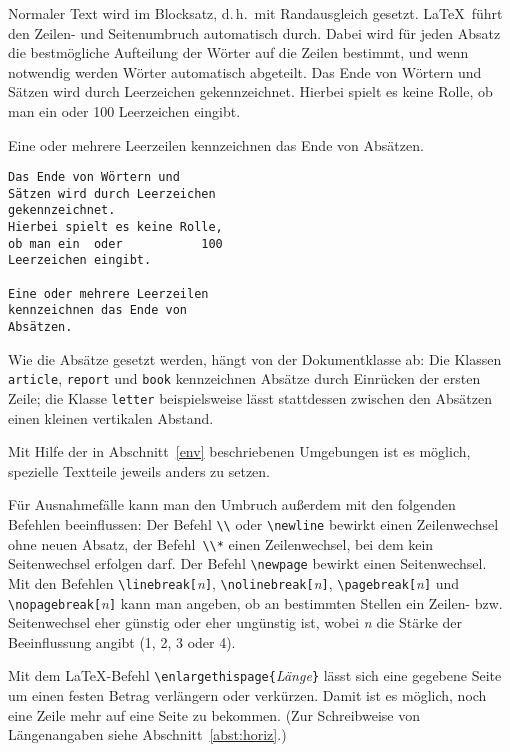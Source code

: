 Normaler Text wird im Blocksatz, d.\,h.~mit Randausgleich
gesetzt.  \LaTeX\ führt den Zeilen- und Seitenumbruch
automatisch durch.  Dabei wird für jeden Absatz die
bestmögliche Aufteilung der Wörter auf die Zeilen bestimmt,
und wenn notwendig werden Wörter automatisch abgeteilt.
\exa
\parindent=17pt\relax
{}\relax %
\noindent Das Ende von Wörtern und Sätzen wird durch Leerzeichen
gekennzeichnet.  Hierbei spielt es keine Rolle, ob man ein oder
100 Leerzeichen eingibt.
\par
Eine oder mehrere Leerzeilen
kennzeichnen das Ende von
Absätzen.
\exb
\begin{verbatim}
Das Ende von Wörtern und
Sätzen wird durch Leerzeichen 
gekennzeichnet.
Hierbei spielt es keine Rolle,
ob man ein  oder           100
Leerzeichen eingibt.
 
Eine oder mehrere Leerzeilen
kennzeichnen das Ende von
Absätzen.
\end{verbatim}
\exc
Wie die Absätze gesetzt werden, hängt von der Dokumentklasse ab: 
Die Klassen 
\texttt{article}, \texttt{report} und \texttt{book} kennzeichnen
Absätze durch Einrücken der ersten Zeile;
die Klasse \texttt{letter} beispielsweise lässt stattdessen 
zwischen den Absätzen einen kleinen vertikalen Abstand.

Mit Hilfe der in Abschnitt~\ref{env} beschriebenen Umgebungen ist
es möglich, spezielle Textteile jeweils anders zu setzen.
 
Für Ausnahmefälle kann man den Umbruch außerdem mit den
folgenden Befehlen beeinflussen:
Der Befehl \verb|\\| oder \verb|\newline| bewirkt einen
Zeilenwechsel ohne neuen Absatz, der Befehl~\verb|\\*| einen
Zeilenwechsel, bei dem kein Seitenwechsel erfolgen darf.
Der Befehl \verb|\newpage| bewirkt einen Seitenwechsel.
Mit den Befehlen
\verb|\linebreak[|\textit{n}\verb|]|,
\verb|\nolinebreak[|\textit{n}\verb|]|,
\verb|\pagebreak[|\textit{n}\verb|]|   und
\verb|\nopagebreak[|\textit{n}\verb|]|
kann man angeben, ob an bestimmten Stellen ein Zeilen- bzw.\ %
Seitenwechsel eher günstig oder eher ungünstig ist, wobei
\textit{n} die Stärke der Beeinflussung angibt (1, 2, 3 oder 4).

Mit dem \LaTeX-Befehl \verb:\enlargethispage{:\textit{Länge}\verb:}:
lässt sich eine gegebene Seite um einen festen Betrag
verlängern oder verkürzen. Damit ist es möglich, noch
eine Zeile mehr auf eine Seite zu bekommen. 
(Zur Schreibweise von Längenangaben siehe Abschnitt~\ref{abst:horiz}.)
 
